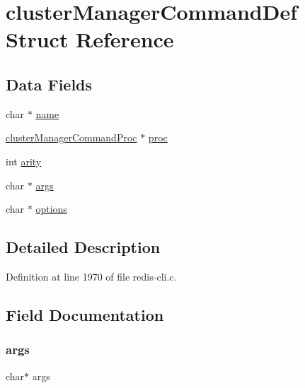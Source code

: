 \hypertarget{structcluster_manager_command_def}{}\section{cluster\+Manager\+Command\+Def Struct Reference}
\label{structcluster_manager_command_def}
\subsection*{Data Fields}
\begin{DoxyCompactItemize}
\item 
char $\ast$ \hyperlink{structcluster_manager_command_def_a5ac083a645d964373f022d03df4849c8}{name}
\item 
\hyperlink{redis-cli_8c_a8e9cfad74d28bc05c1e55864714a460f}{cluster\+Manager\+Command\+Proc} $\ast$ \hyperlink{structcluster_manager_command_def_acec64f15ecc0fd1e401bfc3736963e65}{proc}
\item 
int \hyperlink{structcluster_manager_command_def_a2e1dc7313b72e22a19179823661deb69}{arity}
\item 
char $\ast$ \hyperlink{structcluster_manager_command_def_a0bd887c941dfeb4a13ee1501df2df62d}{args}
\item 
char $\ast$ \hyperlink{structcluster_manager_command_def_ad358cb7ece4fc65136f8d20cf6b12816}{options}
\end{DoxyCompactItemize}


\subsection{Detailed Description}


Definition at line 1970 of file redis-\/cli.\+c.



\subsection{Field Documentation}
\mbox{\label{structcluster_manager_command_def_a0bd887c941dfeb4a13ee1501df2df62d}} 
\subsubsection{\texorpdfstring{args}{args}}
{\footnotesize\ttfamily char$\ast$ args}



